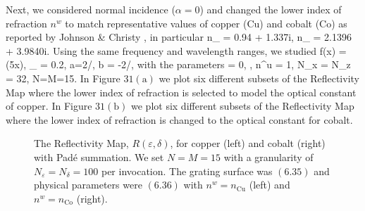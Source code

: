 \vspace{-17mm}
Next, we considered normal incidence ($\alpha = 0$) and changed the lower index of refraction $n^w$ to match representative values
of copper (Cu) and cobalt (Co) as reported by Johnson \& Christy 
\cite{JohnsonChristy72,johnson1974optical}, in particular
\bes
n_{} = 0.94 + 1.337i,
\quad
n_{} = 2.1396 + 3.9840i.
\ees
Using the same frequency and wavelength ranges, we studied
\be
f(x) = \sin(5x),
\quad
\varepsilon_{} = 0.2,
\quad 
a=2/\pi, 
\quad 
b = -2/\pi,
\ee
with the parameters
\be
\alpha = 0,
\quad
{},
\quad
n^u = 1,
\quad
N_x = N_z = 32,
\quad
N=M=15.
\ee
In Figure $31(\text{a})$ we plot six different subsets of the Reflectivity
Map where the lower index of refraction is selected to model the optical constant
of copper. In Figure $31(\text{b})$ we plot six different subsets of 
the Reflectivity Map where the lower index of refraction is changed to the optical
constant for cobalt.
%
%
\vspace{-18mm}
\begin{figure}[H]
    \centering
    \vspace{.15mm}
    \caption{The Reflectivity Map, $R(\varepsilon,\delta)$, for copper (left)
    and cobalt (right) with
    Pad\'e summation. We set $N=M=15$ with a granularity
    of $N_{\varepsilon}=N_{\delta}=100$ per invocation. The grating surface was $(6.35)$ and physical parameters were $(6.36)$ with $n^w = n_{\text{Cu}}$ (left)
    and $n^w = n_{\text{Co}}$ (right).}
    \label{Fig:RM:Metal}
\end{figure}
\vspace{-20mm}

